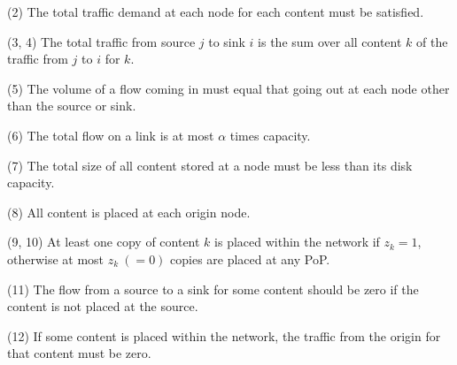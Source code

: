 {\noindent(2) The total traffic demand at each node for each content must be satisfied.

\noindent(3, 4) The total traffic from source $j$ to sink $i$ is the sum over all content $k$ of the traffic from $j$ to $i$ for $k$.

\noindent(5) The volume of a flow coming in must equal that going out at each node other than the source or sink.

\noindent(6) The total flow on a link is at most $\alpha$ times capacity.

\noindent(7) The total size of all content stored at a node must be less than its disk capacity.

\noindent(8) All content is placed at each origin node.

\noindent(9, 10) At least one copy of content $k$ is placed within the network if $z_k = 1$, otherwise at most $z_k \ (=0)$ copies are placed at any PoP.

\noindent(11) The flow from a source to a sink for some content should be zero if the content is not placed at the source.

\noindent(12) If some content is placed within the network, the traffic from the origin for that content must be zero.


}
